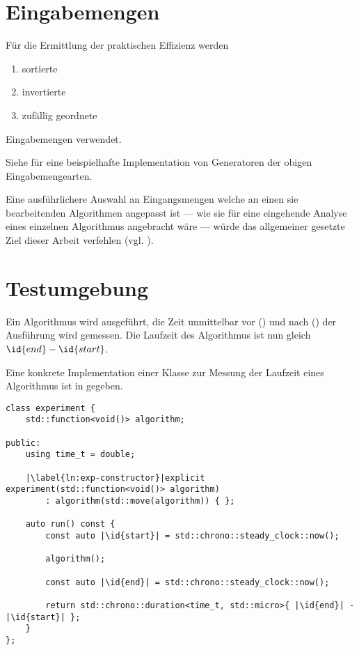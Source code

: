 \section{Eingabemengen}
\label{sec:runtime-inputs}


Für die Ermittlung der praktischen Effizienz werden
\begin{enumerate}[nosep]
    \item sortierte
    \item invertierte
    \item zufällig geordnete
\end{enumerate}
Eingabemengen verwendet.

Siehe  für eine beispielhafte Implementation von Generatoren der obigen Eingabemengearten.

Eine ausführlichere Auswahl an Eingangsmengen welche an einen sie bearbeitenden Algorithmen angepasst ist --- wie sie für eine eingehende Analyse eines einzelnen Algorithmus angebracht wäre --- würde das allgemeiner gesetzte Ziel dieser Arbeit verfehlen (vgl. \cite[27ff]{mcg2012}).

\section{Testumgebung}
\label{sec:runtime-environment}

Ein Algorithmus wird ausgeführt, die Zeit unmittelbar vor () und nach () der Ausführung wird gemessen. Die Laufzeit des Algorithmus ist nun gleich $\id{end} - \id{start}$.

Eine konkrete Implementation einer Klasse zur Messung der Laufzeit eines Algorithmus ist in  gegeben. 

\begin{lstlisting}[caption={Implementation einer Klasse zur Ermittlung der Laufzeit eines Algorithmus.}, label=lst:experiment]
class experiment {
	std::function<void()> algorithm;

public:
	using time_t = double;

	|\label{ln:exp-constructor}|explicit experiment(std::function<void()> algorithm)
		: algorithm(std::move(algorithm)) { };

	auto run() const {
		const auto |\id{start}| = std::chrono::steady_clock::now();

		algorithm();

		const auto |\id{end}| = std::chrono::steady_clock::now();

		return std::chrono::duration<time_t, std::micro>{ |\id{end}| - |\id{start}| };
	}
};
\end{lstlisting}

